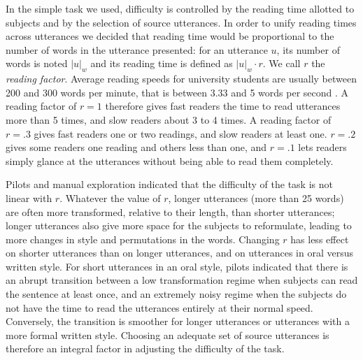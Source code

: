In the simple task we used, difficulty is controlled by the reading time
allotted to subjects and by the selection of source utterances. In order
to unify reading times across utterances we decided that reading time
would be proportional to the number of words in the utterance presented:
for an utterance \(u\), its number of words is noted \(|u|_w\) and its
reading time is defined as \(|u|_w \cdot r\). We call \(r\) the
\emph{reading factor}. Average reading speeds for university students
are usually between 200 and 300 words per minute, that is between 3.33
and 5 words per second \autocite[see][where fast readers average at
330~wpm and slow readers average at 207~wpm]{rayner_eye_2010}. A reading
factor of \(r = 1\) therefore gives fast readers the time to read
utterances more than 5 times, and slow readers about 3 to 4 times. A
reading factor of \(r = .3\) gives fast readers one or two readings, and
slow readers at least one. \(r = .2\) gives some readers one reading and
others less than one, and \(r = .1\) lets readers simply glance at the
utterances without being able to read them completely.

Pilots and manual exploration indicated that the difficulty of the task
is not linear with \(r\). Whatever the value of \(r\), longer utterances
(more than 25 words) are often more transformed, relative to their
length, than shorter utterances; longer utterances also give more space
for the subjects to reformulate, leading to more changes in style and
permutations in the words. Changing \(r\) has less effect on shorter
utterances than on longer utterances, and on utterances in oral versus
written style. For short utterances in an oral style, pilots indicated
that there is an abrupt transition between a low transformation regime
when subjects can read the sentence at least once, and an extremely
noisy regime when the subjects do not have the time to read the
utterances entirely at their normal speed. Conversely, the transition is
smoother for longer utterances or utterances with a more formal written
style. Choosing an adequate set of source utterances is therefore an
integral factor in adjusting the difficulty of the task.

